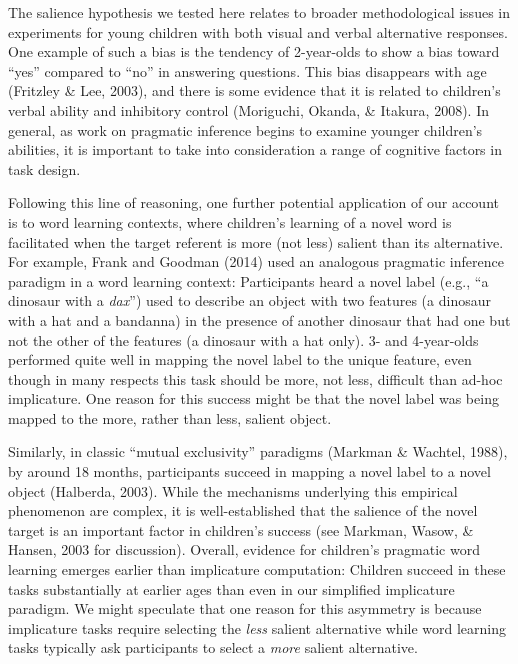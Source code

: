 \documentclass[man]{apa6}
\begin{document}
The salience hypothesis we tested here relates to broader methodological
issues in experiments for young children with both visual and verbal
alternative responses. One example of such a bias is the tendency of
2-year-olds to show a bias toward \enquote{yes} compared to \enquote{no}
in answering questions. This bias disappears with age (Fritzley \& Lee,
2003), and there is some evidence that it is related to children's
verbal ability and inhibitory control (Moriguchi, Okanda, \& Itakura,
2008). In general, as work on pragmatic inference begins to examine
younger children's abilities, it is important to take into consideration
a range of cognitive factors in task design.

Following this line of reasoning, one further potential application of
our account is to word learning contexts, where children's learning of a
novel word is facilitated when the target referent is more (not less)
salient than its alternative. For example, Frank and Goodman (2014) used
an analogous pragmatic inference paradigm in a word learning context:
Participants heard a novel label (e.g., \enquote{a dinosaur with a
\emph{dax}}) used to describe an object with two features (a dinosaur
with a hat and a bandanna) in the presence of another dinosaur that had
one but not the other of the features (a dinosaur with a hat only). 3-
and 4-year-olds performed quite well in mapping the novel label to the
unique feature, even though in many respects this task should be more,
not less, difficult than ad-hoc implicature. One reason for this success
might be that the novel label was being mapped to the more, rather than
less, salient object.

Similarly, in classic \enquote{mutual exclusivity} paradigms (Markman \&
Wachtel, 1988), by around 18 months, participants succeed in mapping a
novel label to a novel object (Halberda, 2003). While the mechanisms
underlying this empirical phenomenon are complex, it is well-established
that the salience of the novel target is an important factor in
children's success (see Markman, Wasow, \& Hansen, 2003 for discussion).
Overall, evidence for children's pragmatic word learning emerges earlier
than implicature computation: Children succeed in these tasks
substantially at earlier ages than even in our simplified implicature
paradigm. We might speculate that one reason for this asymmetry is
because implicature tasks require selecting the \emph{less} salient
alternative while word learning tasks typically ask participants to
select a \emph{more} salient alternative.
\end{document}
